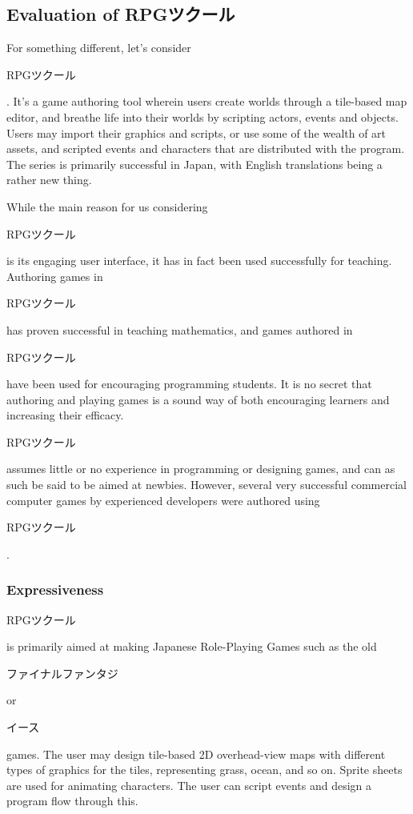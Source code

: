 \begin{CJK}{UTF8}{min}
\subsection{Evaluation of RPGツクール}
\end{CJK}

For something different, let's consider 
\begin{CJK}{UTF8}{min}RPGツクール\end{CJK}. It's a game authoring tool wherein 
users create worlds through a tile-based map editor, and breathe life into 
their worlds by scripting actors, events and objects. Users may import their 
graphics and scripts, or use some of the wealth of art assets, and scripted 
events and characters that are distributed with the program. The series is 
primarily successful in Japan, with English translations being a rather new 
thing.

While the main reason for us considering 
\begin{CJK}{UTF8}{min}RPGツクール\end{CJK} is its engaging user interface, it 
has in fact been used successfully for teaching. Authoring games in 
\begin{CJK}{UTF8}{min}RPGツクール\end{CJK} has proven successful in teaching 
mathematics\cite{maltempi2004learning}, and games authored in 
\begin{CJK}{UTF8}{min}RPGツクール\end{CJK} have been used for encouraging 
programming students\cite{Ralph_1the}. It is no secret that authoring and 
playing games is a sound way of both encouraging learners and increasing their 
efficacy.

\begin{CJK}{UTF8}{min}RPGツクール\end{CJK} assumes little or no experience in 
programming or designing games, and can as such be said to be aimed at 
newbies. However, several very successful commercial computer games by 
experienced developers were authored using 
\begin{CJK}{UTF8}{min}RPGツクール\end{CJK}.

\subsubsection{Expressiveness}

\begin{CJK}{UTF8}{min}RPGツクール\end{CJK} is primarily aimed at making 
Japanese Role-Playing Games such as the old 
\begin{CJK}{UTF8}{min}ファイナルファンタジ\end{CJK} or 
\begin{CJK}{UTF8}{min}イース\end{CJK} games. The user may design tile-based 2D 
overhead-view maps with different types of graphics for the tiles, 
representing grass, ocean, and so on. Sprite sheets are used for animating 
characters. The user can script events and design a program flow through this.

